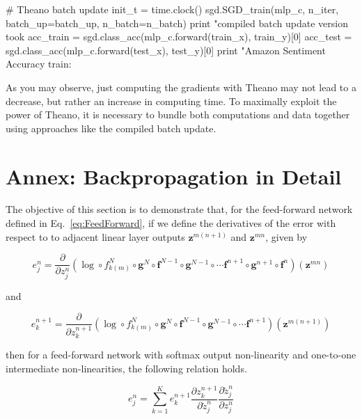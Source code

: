 \begin{exercise}
\begin{python}
# Theano batch update
init_t = time.clock()
sgd.SGD_train(mlp_c, n_iter, batch_up=batch_up, n_batch=n_batch)
print "\nTheano compiled batch update version took %
acc_train = sgd.class_acc(mlp_c.forward(train_x), train_y)[0]
acc_test  = sgd.class_acc(mlp_c.forward(test_x), test_y)[0]
print "Amazon Sentiment Accuracy train: %
\end{python}
As you may observe, just computing the gradients with Theano may not lead to
a decrease, but rather an increase in computing time. To maximally exploit
the power of Theano, it is necessary to bundle both computations and data 
together using approaches like the compiled batch update.
\end{exercise}

\section*{Annex: Backpropagation in Detail}

The objective of this section is to demonstrate that, for the feed-forward
network defined in Eq.~\ref{eq:FeedForward}, if we define the derivatives of
the error with respect to to adjacent linear layer outputs
$\mathbf{z}^{m(n+1)}$ and $\mathbf{z}^{mn}$, given by

\begin{equation}
e^{n}_j = \frac{\partial}{\partial z^{n}_{j}} (\log \circ f_{k(m)}^N \circ \mathbf{g}^N \circ \mathbf{f}^{N-1} \circ \mathbf{g}^{N-1} \circ \cdots \mathbf{f}^{n+1} \circ \mathbf{g}^{n+1} \circ \mathbf{f}^{n})(\mathbf{z}^{mn}) 
\label{eq:endetail}
\end{equation}

\noindent and 

\begin{equation}
e^{n+1}_k = \frac{\partial}{\partial z^{n+1}_{k}} (\log \circ f_{k(m)}^N \circ \mathbf{g}^N \circ \mathbf{f}^{N-1} \circ \mathbf{g}^{N-1} \circ \cdots \mathbf{f}^{n+1})(\mathbf{z}^{m(n+1)})
\label{eq:enp1detail}
\end{equation}

\noindent then for a feed-forward network with softmax output non-linearity and one-to-one intermediate non-linearities, the following relation holds. 

\begin{equation}
e^{n}_j = \sum_{k=1}^K e^{n+1}_k \frac{\partial z^{n+1}_k}{\partial \tilde{z}_{j}^n}\frac{\partial \tilde{z}^n_{j}}{\partial z_{j}^n} 
\label{eq:DetailchainRulRecursion}
\end{equation}

